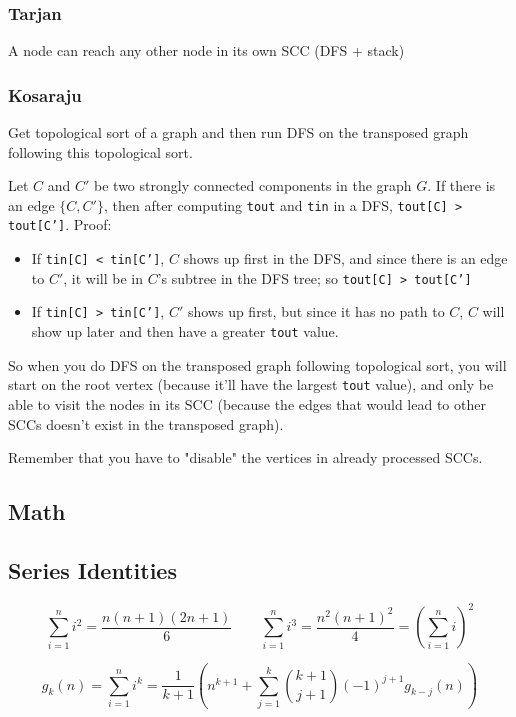 \documentclass[12pt, a4paper, twoside]{article}
\begin{document}
\subsubsection{Tarjan}
A node can reach any other node in its own SCC (DFS + stack)

\subsubsection{Kosaraju}
Get topological sort of a graph and then run DFS on the transposed graph following this topological sort.

Let $C$ and $C'$ be two strongly connected components in the graph $G$. If there is an edge $\{C, C'\}$, then after computing \texttt{tout} and \texttt{tin} in a DFS, \texttt{tout[C] > tout[C']}. Proof:
\begin{itemize}
  \item If \texttt{tin[C] < tin[C']}, $C$ shows up first in the DFS, and since there is an edge to $C'$, it will be in $C$'s subtree in the DFS tree; so \texttt{tout[C] > tout[C']}
  \item If \texttt{tin[C] > tin[C']}, $C'$ shows up first, but since it has no path to $C$, $C$ will show up later and then have a greater \texttt{tout} value.
\end{itemize}

So when you do DFS on the transposed graph following topological sort, you will start on the root vertex (because it'll have the largest \texttt{tout} value), and only be able to visit the nodes in its SCC (because the edges that would lead to other SCCs doesn't exist in the transposed graph).

Remember that you have to "disable" the vertices in already processed SCCs.

\subsection{Math}
\subsection{Series Identities}

$$\sum_{i=1}^{n} i^{2} = \frac{n(n+1)(2n+1)}{6}  \qquad  \sum_{i=1}^{n} i^{3} = \frac{n^{2}(n+1)^{2}}{4} = \left(\sum_{i=1}^n i\right)^2$$

$$ g_k(n) = \sum_{i=1}^n i^k = \frac{1}{k+1} \left( n^{k+1} + \sum_{j=1}^k \binom{k+1}{j+1} (-1)^{j+1} g_{k-j}(n) \right) $$
\end{document}
